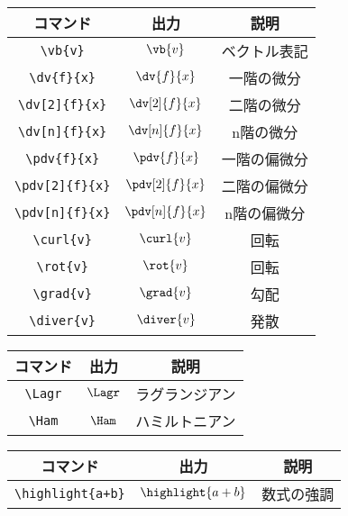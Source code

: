 \begin{longtable}{ccc}
    \toprule
    コマンド             & 出力                            & 説明         \\
    \midrule
    \verb|\vb{v}|        & \(\vb{v}\)                      & ベクトル表記 \\
    \verb|\dv{f}{x}|     & \(\displaystyle \dv{f}{x}\)     & 一階の微分   \\
    \verb|\dv[2]{f}{x}|  & \(\displaystyle \dv[2]{f}{x}\)  & 二階の微分   \\
    \verb|\dv[n]{f}{x}|  & \(\displaystyle \dv[n]{f}{x}\)  & n階の微分    \\
    \verb|\pdv{f}{x}|    & \(\displaystyle \pdv{f}{x}\)    & 一階の偏微分 \\
    \verb|\pdv[2]{f}{x}| & \(\displaystyle \pdv[2]{f}{x}\) & 二階の偏微分 \\
    \verb|\pdv[n]{f}{x}| & \(\displaystyle \pdv[n]{f}{x}\) & n階の偏微分  \\
    \verb|\curl{v}|      & \(\displaystyle \curl{v}\)      & 回転         \\
    \verb|\rot{v}|       & \(\displaystyle \rot{v}\)       & 回転         \\
    \verb|\grad{v}|      & \(\displaystyle \grad{v}\)      & 勾配         \\
    \verb|\diver{v}|     & \(\displaystyle \diver{v}\)     & 発散         \\
    \bottomrule
\end{longtable}

\begin{longtable}{ccc}
    \toprule
    コマンド     & 出力      & 説明           \\
    \midrule
    \verb|\Lagr| & \(\Lagr\) & ラグランジアン \\
    \verb|\Ham|  & \(\Ham\)  & ハミルトニアン \\
    \bottomrule
\end{longtable}

\begin{longtable}{ccc}
    \toprule
    コマンド               & 出力                              & 説明       \\
    \midrule
    \verb|\highlight{a+b}| & \(\displaystyle \highlight{a+b}\) & 数式の強調 \\
    \bottomrule
\end{longtable}